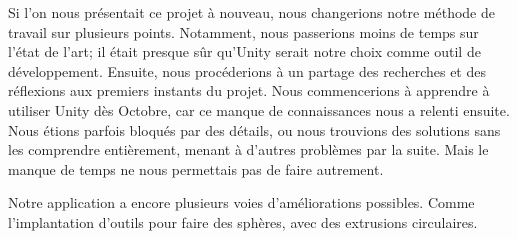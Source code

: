 \documentclass[a4paper,11pt]{article}
\begin{document}
			Si l'on nous présentait ce projet à nouveau, nous changerions notre méthode de travail sur plusieurs points. Notamment, nous passerions moins de temps sur l'état de l'art; il était presque sûr qu'Unity serait notre choix comme outil de développement. Ensuite, nous procéderions à un partage des recherches et des réflexions aux premiers instants du projet. Nous commencerions à apprendre à utiliser Unity dès Octobre, car ce manque de connaissances nous a relenti ensuite. Nous étions parfois bloqués par des détails, ou nous trouvions des solutions sans les comprendre entièrement, menant à d'autres problèmes par la suite. Mais le manque de temps ne nous permettais pas de faire autrement.
			
			Notre application a encore plusieurs voies d'améliorations possibles. Comme l'implantation d'outils pour faire des sphères, avec des extrusions circulaires.
	
\end{document}
